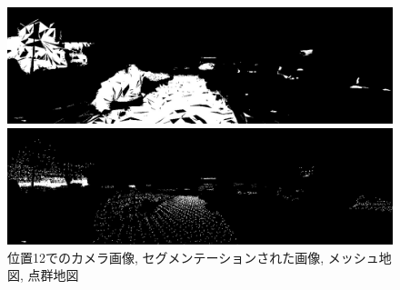 \begin{figure}[htbp]
\begin{minipage}[b]{0.50\hsize}
\begin{center}
  \end{center}
 \end{minipage} \\
  \begin{minipage}[b]{0.50\hsize}
 \begin{center}
  \includegraphics[keepaspectratio, scale=0.18]{./picture/valued_mesh_map_image/image11.jpg}
  \end{center}
 \end{minipage}
 \begin{minipage}[b]{0.50\hsize}
 \begin{center}
  \includegraphics[keepaspectratio, scale=0.18]{./picture/valued_point_map_image/image11.jpg}
  \end{center}
 \end{minipage}
 \caption{位置12でのカメラ画像, セグメンテーションされた画像, メッシュ地図, 点群地図}\label{fig:place12}
\end{figure}

